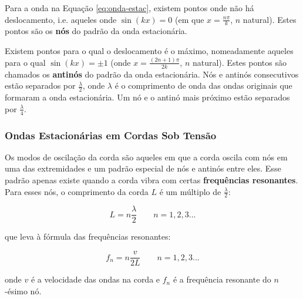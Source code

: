 Para a onda na Equação \ref{eq:onda-estac}, existem pontos onde não há deslocamento, i.e. aqueles onde $\sin(kx)=0$ (em que $x=\frac{n\pi}{k}$, $n$ natural). Estes pontos são os \textbf{nós} do padrão da onda estacionária.

Existem pontos para o qual o deslocamento é o máximo, nomeadamente aqueles para o qual $\sin(kx)=\pm1$ (onde $x=\frac{(2n+1)\pi}{2k}$, $n$ natural). Estes pontos são chamados os \textbf{antinós} do padrão da onda estacionária. Nós e antinós consecutivos estão separados por $\frac{\lambda}{2}$, onde $\lambda$ é o comprimento de onda das ondas originais que formaram a onda estacionária. Um nó e o antinó mais próximo estão separados por $\frac{\lambda}{4}$.

\subsubsection{Ondas Estacionárias em Cordas Sob Tensão}
Os modos de oscilação da corda são aqueles em que a corda oscila com nós em uma das extremidades e um padrão especial de nós e antinós entre eles. Esse padrão apenas existe quando a corda vibra com certas \textbf{frequências resonantes}. Para esses nós, o comprimento da corda $L$ é um múltiplo de $\frac{\lambda}{2}$:

\begin{equation*}
    L=n\frac{\lambda}{2} \qquad n=1,2,3...
\end{equation*}

que leva à fórmula das frequências resonantes:

\begin{equation}
    f_n=n\frac{v}{2L} \qquad n=1,2,3...
\end{equation}

onde $v$ é a velocidade das ondas na corda e $f_n$ é a frequência resonante do $n$-ésimo nó.